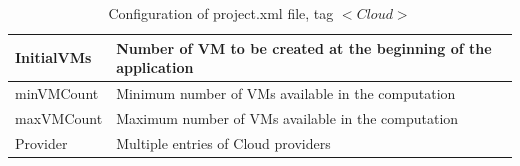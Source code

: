 \bgroup
  \def\arraystretch{1.5}
  \begin{table}[h]
    \begin{center}
      \begin{tabular}{| p{} | p{} |}
	\hline
	InitialVMs	&	Number of VM to be created at the beginning of the application	\\
	\hline
	minVMCount	&	Minimum number of VMs available in the computation	\\
	\hline
	maxVMCount	&	Maximum number of VMs available in the computation	\\
	\hline
	Provider 	&	Multiple entries of Cloud providers	\\
	\hline
      \end{tabular}
      \caption{Configuration of project.xml file, tag $<Cloud>$}
      \label{tab:conf_project_xml_cloud}
    \end{center}
  \end{table}
\egroup

\newpage

